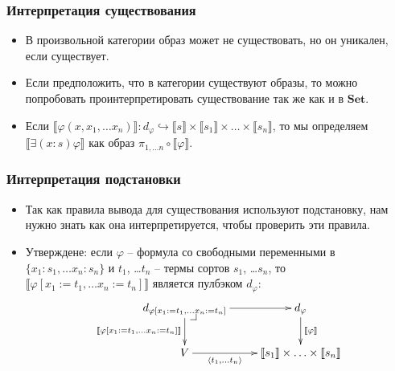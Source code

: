 \documentclass{beamer}
\makeatletter
\theoremstyle{definition}
\newcommand{\cat}[1]{\mathbf{#1}}
\newcommand{\Set}{\cat{Set}}
\renewcommand{\ll}{\llbracket}
\newcommand{\rr}{\rrbracket}
\newcommand{\repl}{:=}
\newcommand{\pb}[1][dr]{\save*!/#1-1.2pc/#1:(-1,1)@^{|-}\restore}
\makeatother
\begin{document}
\begin{frame}
\frametitle{Интерпретация существования}
\begin{itemize}
\item В произвольной категории образ может не существовать, но он уникален, если существует.
\item Если предположить, что в категории существуют образы, то можно попробовать проинтерпретировать существование так же как и в $\Set$.
\item Если $\ll \varphi(x, x_1, \ldots x_n) \rr : d_\varphi \hookrightarrow \ll s \rr \times \ll s_1 \rr \times \ldots \times \ll s_n \rr$,
то мы определяем $\ll \exists (x : s) \varphi \rr$ как образ $\pi_{1, \ldots n} \circ \ll \varphi \rr$.
\end{itemize}
\end{frame}

\begin{frame}
\frametitle{Интерпретация подстановки}
\begin{itemize}
\item Так как правила вывода для существования используют подстановку, нам нужно знать как она интерпретируется, чтобы проверить эти правила.
\item Утверждене: если $\varphi$ -- формула со свободными переменными в $\{ x_1 : s_1, \ldots x_n : s_n \}$ и $t_1$, \ldots $t_n$ -- термы сортов $s_1$, \ldots $s_n$,
то $\ll \varphi[x_1 \repl t_1, \ldots x_n \repl t_n] \rr$ является пулбэком $d_\varphi$:
\[ \xymatrix{ d_{\varphi[x_1 \repl t_1, \ldots x_n \repl t_n]} \ar[r] \ar[d]_{\ll \varphi[x_1 \repl t_1, \ldots x_n \repl t_n] \rr} \pb & d_\varphi \ar[d]^{\ll \varphi \rr} \\
              V \ar[r]_-{\langle t_1, \ldots t_n \rangle}                                                                               & \ll s_1 \rr \times \ldots \times \ll s_n \rr
            } \]
\end{itemize}
\end{frame}
\end{document}
